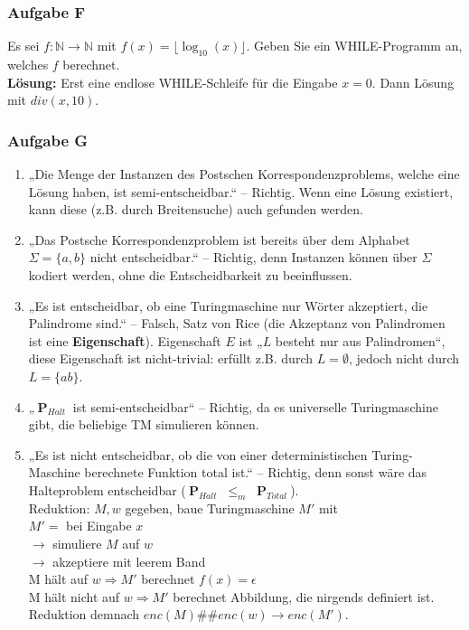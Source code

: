 \documentclass[a4paper,10pt]{article}
\newcommand{\f}[1]{\textbf{#1}}
\newcommand{\prob}[1]{\textbf{#1}}
\newcommand{\prspec}[1]{$~\prob{P}_{#1}~$}
\newcommand{\N}{\mathbb{N}}
\begin{document}
    \subsubsection*{Aufgabe F}
        Es sei $f:\N\to\N$ mit $f(x)=\lfloor\log_{10}(x)\rfloor$. Geben Sie ein WHILE-Programm an, welches $f$ berechnet. \\
        \textbf{Lösung:} Erst eine endlose WHILE-Schleife für die Eingabe $x=0$. Dann Lösung mit $div(x, 10)$.

    \subsubsection*{Aufgabe G}
        \begin{enumerate}
            \item „Die Menge der Instanzen des Postschen Korrespondenzproblems, welche eine Lösung haben, ist semi-entscheidbar.“ – Richtig. Wenn eine Lösung existiert, kann diese (z.B. durch Breitensuche) auch gefunden werden.

            \item „Das Postsche Korrespondenzproblem ist bereits über dem Alphabet $\Sigma = \{a,b\}$ nicht entscheidbar.“ – Richtig, denn Instanzen können über $\Sigma$ kodiert werden, ohne die Entscheidbarkeit zu beeinflussen.

            \item „Es ist entscheidbar, ob eine Turingmaschine nur Wörter akzeptiert, die Palindrome sind.“ – Falsch, Satz von Rice (die Akzeptanz von Palindromen ist eine \f{Eigenschaft}). Eigenschaft $E$ ist „$L$ besteht nur aus Palindromen“, diese Eigenschaft ist nicht-trivial: erfüllt z.B. durch $L = \emptyset$, jedoch nicht durch $L = \{ab\}$.

            \item „\prspec{Halt} ist semi-entscheidbar“ – Richtig, da es universelle Turingmaschine gibt, die beliebige TM simulieren können.

            \item „Es ist nicht entscheidbar, ob die von einer deterministischen Turing-Maschine berechnete Funktion total ist.“ – Richtig, denn sonst wäre das Halteproblem entscheidbar (\prspec{Halt} $\leq_m$ \prspec{Total}). \\
            Reduktion: $M, w$ gegeben, baue Turingmaschine $M'$ mit \\
            $M' =$ bei Eingabe $x$ \\
            $\to$ simuliere $M$ auf $w$ \\
            $\to$ akzeptiere mit leerem Band \\
            M hält auf $w \Rightarrow M'$ berechnet $f(x)= \epsilon$ \\
            M hält nicht auf $w \Rightarrow M'$ berechnet Abbildung, die nirgends definiert ist. \\
            Reduktion demnach $enc(M)\#\#enc(w) \rightarrow enc(M')$.


\end{enumerate}
\end{document}
